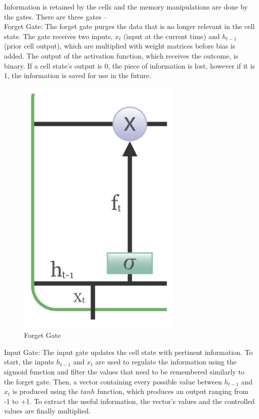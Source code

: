 Information is retained by the cells and the memory manipulations are done by the gates. There are three gates – \\
Forget Gate: The forget gate purges the data that is no longer relevant in the cell state. The gate receives two inputs, $x_t$ (input at the current time) and $h_{t-1}$ (prior cell output), which are multiplied with weight matrices before bias is added. The output of the activation function, which receives the outcome, is binary. If a cell state's output is 0, the piece of information is lost, however if it is 1, the information is saved for use in the future.
\begin{figure}[H]
    \centering
    \includegraphics[width=0.7\textwidth]{Images/lstm_forget.png}
    \caption{Forget Gate}
    \label{fig1}
\end{figure}

Input Gate: The input gate updates the cell state with pertinent information. To start, the inputs $h_{t-1}$ and $x_t$ are used to regulate the information using the sigmoid function and filter the values that need to be remembered similarly to the forget gate. Then, a vector containing every possible value between $h_{t-1}$ and $x_t$ is produced using the $tanh$ function, which produces an output ranging from -1 to +1. To extract the useful information, the vector's values and the controlled values are finally multiplied.



